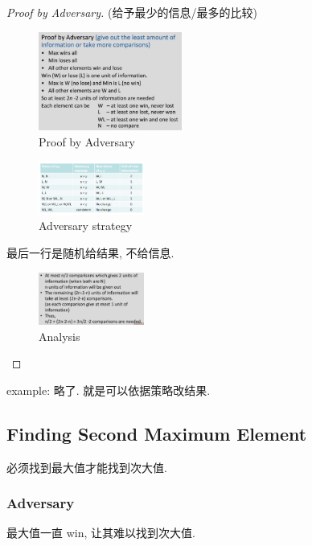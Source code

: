 \begin{proof}[Proof by Adversary] (给予最少的信息/最多的比较)
    \begin{figure}[H]
        \centering
        \includegraphics[width=0.42\textwidth]{pic/DAA2/Proof by Adversaryp1.png}
        \caption{Proof by Adversary}
    \end{figure}
    
    \begin{figure}[H]
        \centering
        \includegraphics[width=0.309\textwidth]{pic/DAA2/Adversary strategy}
        \caption{Adversary strategy}
    \end{figure}
    最后一行是随机给结果, 不给信息.

    \begin{figure}[H]
        \centering
        \includegraphics[width=0.309\textwidth]{pic/DAA2/Analysis}
        \caption{Analysis}
    \end{figure}
    
\end{proof}

example: 略了. 就是可以依据策略改结果. 

\subsection{Finding Second Maximum Element}
必须找到最大值才能找到次大值. 

\subsubsection{Adversary}
最大值一直 win, 让其难以找到次大值. 

